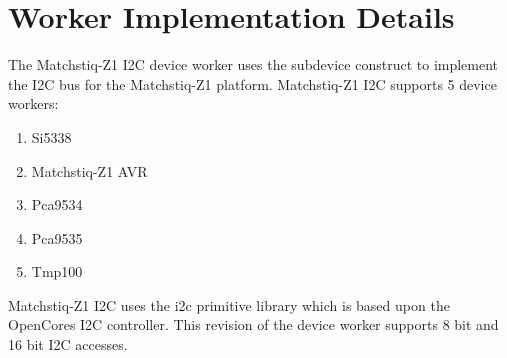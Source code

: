 \iffalse
This file is protected by Copyright. Please refer to the COPYRIGHT file
distributed with this source distribution.

This file is part of OpenCPI <http://www.opencpi.org>

OpenCPI is free software: you can redistribute it and/or modify it under the
terms of the GNU Lesser General Public License as published by the Free Software
Foundation, either version 3 of the License, or (at your option) any later
version.

OpenCPI is distributed in the hope that it will be useful, but WITHOUT ANY
WARRANTY; without even the implied warranty of MERCHANTABILITY or FITNESS FOR A
PARTICULAR PURPOSE. See the GNU Lesser General Public License for more details.

You should have received a copy of the GNU Lesser General Public License along
with this program. If not, see <http://www.gnu.org/licenses/>.
\fi

\def\comp{matchstiq\_{}z1\_{}i2c}
\edef\ecomp{matchstiq_z1_i2c}
\def\Comp{Matchstiq-Z1 I2C}
\def\docTitle{\Comp{} Component Data Sheet}
\def\snippetpath{../../../../../../../../doc/av/tex/snippets}

\graphicspath{{figures/}}


\maketitle
\thispagestyle{empty}
\newpage

\def\name{\comp}
\def\workertype{Device}
\def\version{\ocpiversion}
\def\releasedate{4/2019}
\def\componentlibrary{ocpi.assets.platforms.matchstiq\_{}z1.devices}
\def\workers{\comp{}.hdl}
\def\testedplatforms{Matchstiq-Z1(PL)}


\section*{Worker Implementation Details}
The Matchstiq-Z1 I2C device worker uses the subdevice construct to implement the I2C bus for the Matchstiq-Z1 platform. Matchstiq-Z1 I2C supports 5 device workers:
\begin{enumerate}
	\item Si5338
	\item Matchstiq-Z1 AVR
	\item Pca9534
	\item Pca9535
	\item Tmp100
\end{enumerate}
Matchstiq-Z1 I2C uses the i2c primitive library which is based upon the OpenCores I2C controller. This revision of the device worker supports 8 bit and 16 bit I2C accesses.

